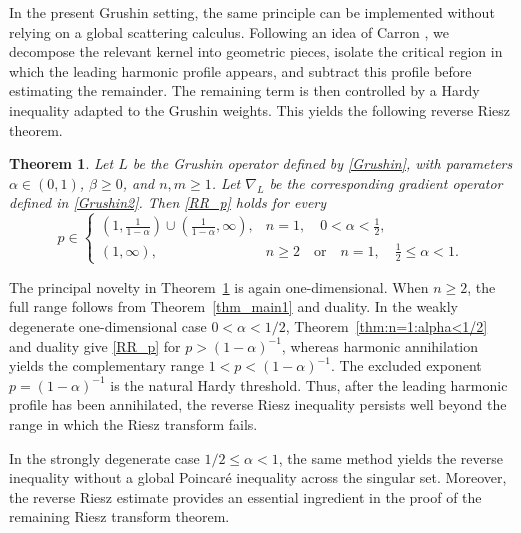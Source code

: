\documentclass[12pt]{amsart}
\newtheorem{theorem}{Theorem}[section]
\begin{document}
In the present Grushin setting, the same principle can be implemented
without relying on a global scattering calculus. Following an idea of
Carron \cite{Gilles}, we decompose the relevant kernel into geometric pieces, isolate the critical region in which the leading harmonic profile appears, and subtract this profile before estimating the remainder. The remaining term is then controlled by a Hardy inequality adapted to the Grushin weights. This yields the following reverse Riesz theorem.

\begin{theorem}\label{thm_main2}
Let $L$ be the Grushin operator defined by \eqref{Grushin}, with parameters $\alpha\in(0,1)$, $\beta\geq0$, and $n,m\geq1$. Let $\nabla_L$ be the corresponding gradient operator defined in \eqref{Grushin2}. Then \eqref{RR_p} holds for every
\begin{equation}\label{p2}
   p\in
   \begin{cases}
        \left(1,\frac{1}{1-\alpha}\right)
        \cup
        \left(\frac{1}{1-\alpha},\infty\right),
        & n=1,\quad 0<\alpha<\frac12,\\[3mm]
        (1,\infty),
        & n\geq2
        \quad\text{or}\quad
        n=1,\quad \frac12\leq\alpha<1.
   \end{cases}
\end{equation}
\end{theorem}

The principal novelty in Theorem~\ref{thm_main2} is again one-dimensional.
When $n\geq2$, the full range follows from Theorem~\ref{thm_main1} and
duality. In the weakly degenerate one-dimensional case
$0<\alpha<1/2$, Theorem~\ref{thm:n=1:alpha<1/2} and duality give
\eqref{RR_p} for $p>(1-\alpha)^{-1}$, whereas harmonic annihilation yields the complementary range
$1<p<(1-\alpha)^{-1}$. The excluded exponent
$p=(1-\alpha)^{-1}$ is the natural Hardy threshold. Thus, after the leading
harmonic profile has been annihilated, the reverse Riesz inequality persists
well beyond the range in which the Riesz transform fails.

In the strongly degenerate case $1/2\leq\alpha<1$, the same method yields the
reverse inequality without a global Poincar\'e inequality across the
singular set. Moreover, the reverse Riesz estimate provides an essential
ingredient in the proof of the remaining Riesz transform theorem.
\end{document}
